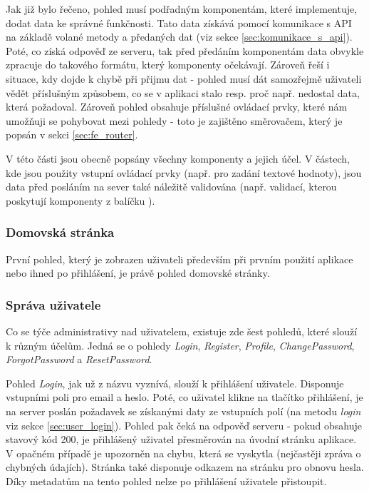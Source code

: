 	Jak již bylo řečeno, pohled musí podřadným komponentám, které implementuje, dodat data ke správné funkčnosti. Tato data získává pomocí komunikace s API na základě volané metody a předaných dat (viz sekce \ref{sec:komunikace_s_api}). Poté, co získá odpověď ze serveru, tak před předáním komponentám data obvykle zpracuje do takového formátu, který komponenty očekávají. Zároveň řeší i situace, kdy dojde k chybě při přijmu dat - pohled musí dát samozřejmě uživateli vědět příslušným způsobem, co se v aplikaci stalo resp. proč např. nedostal data, která požadoval. Zároveň pohled obsahuje příslušné ovládací prvky, které nám umožňuji se pohybovat mezi pohledy - toto je zajištěno směrovačem, který je popsán v sekci \ref{sec:fe_router}.
	
	V této části jsou obecně popsány všechny komponenty a jejich účel. V částech, kde jsou použity vstupní ovládací prvky (např. pro zadání textové hodnoty), jsou data před posláním na sever také náležitě validována (např. validací, kterou poskytují komponenty z balíčku ). %
		
		\subsubsection{Domovská stránka} %
		První pohled, který je zobrazen uživateli především při prvním použití aplikace nebo ihned po přihlášení, je právě pohled domovské stránky. 
	
		\subsubsection{Správa uživatele} %
		Co se týče administrativy nad uživatelem, existuje zde šest pohledů, které slouží k různým účelům. Jedná se o pohledy \textit{Login}, \textit{Register}, \textit{Profile}, \textit{ChangePassword}, \textit{ForgotPassword} a \textit{ResetPassword}.
		
		Pohled \textit{Login}, jak už z názvu vyznívá, slouží k přihlášení uživatele. Disponuje vstupními poli pro email a heslo. Poté, co uživatel klikne na tlačítko přihlášení, je na server poslán požadavek se získanými daty ze vstupních polí (na metodu \textit{login} viz sekce \ref{sec:user_login}). Pohled pak čeká na odpověď serveru - pokud obsahuje stavový kód 200, je přihlášený uživatel přesměrován na úvodní stránku aplikace. V opačném případě je upozorněn na chybu, která se vyskytla (nejčastěji zpráva o chybných údajích). Stránka také disponuje odkazem na stránku pro obnovu hesla. Díky metadatům na tento pohled nelze po přihlášení uživatele přistoupit.
		
